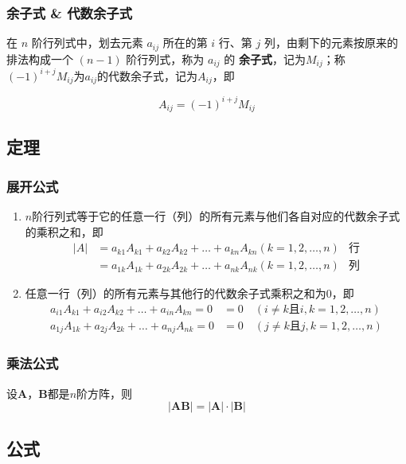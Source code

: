 \documentclass[a4paper,12pt]{article}
\begin{document}
    \subsubsection{余子式 \& 代数余子式}

    在 $n$ 阶行列式中，划去元素 $a_{ij}$ 所在的第 $i$ 行、第 $j$ 列，由剩下的元素按原来的排法构成一个 $(n-1)$ 阶行列式，称为 $a_{ij}$ 的 \textbf{余子式}，记为$M_{ij}$；称$(-1)^{i+j}M_{ij}$为$a_{ij}$的代数余子式，记为$A_{ij}$，即

    \[
        A_{ij} = (-1)^{i+j}M_{ij}
    \]

    \subsection{定理}

    \subsubsection{展开公式}

    \begin{enumerate}
        \item $n$阶行列式等于它的任意一行（列）的所有元素与他们各自对应的代数余子式的乘积之和，即
        \begin{align*}
            |A| &= a_{k1}A_{k1} + a_{k2}A_{k2} + \dots + a_{kn}A_{kn} (k=1,2,\dots,n)  & \text{行} \\
            &= a_{1k}A_{1k} + a_{2k}A_{2k} + \dots + a_{nk}A_{nk} (k=1,2,\dots,n)  & \text{列}
        \end{align*}
        \item 任意一行（列）的所有元素与其他行的代数余子式乘积之和为0，即
        \begin{align*}
            a_{i1}A_{k1} + a_{i2}A_{k2} + \dots + a_{in}A_{kn} = 0 &= 0  \quad  (i \neq k \text{且} i,k=1,2,\dots,n)   \\
            a_{1j}A_{1k} + a_{2j}A_{2k} + \dots + a_{nj}A_{nk} = 0 &= 0  \quad  (j \neq k \text{且} j,k=1,2,\dots,n)
        \end{align*}
    \end{enumerate}

    \subsubsection{乘法公式}
    设$\mathbf{A}$，$\mathbf{B}$都是$n$阶方阵，则
    \[
        |\mathbf{AB}| = |\mathbf{A}| \cdot |\mathbf{B}|
    \]

    \subsection{公式}
\end{document}
